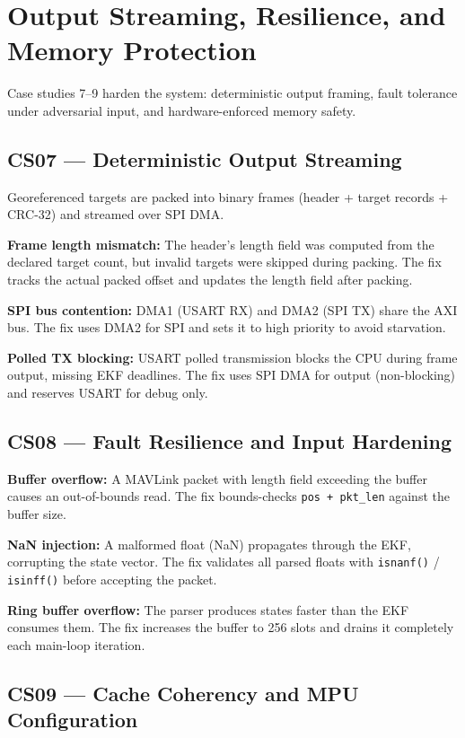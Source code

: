 \section{Output Streaming, Resilience, and Memory Protection}
\label{sec:cs07-09}

Case studies 7--9 harden the system: deterministic output framing, fault tolerance under adversarial input, and hardware-enforced memory safety.

\subsection{CS07 --- Deterministic Output Streaming}

Georeferenced targets are packed into binary frames (header + target records + CRC-32) and streamed over SPI DMA.

\textbf{Frame length mismatch:} The header's length field was computed from the declared target count, but invalid targets were skipped during packing. The fix tracks the actual packed offset and updates the length field after packing.

\textbf{SPI bus contention:} DMA1 (USART RX) and DMA2 (SPI TX) share the AXI bus. The fix uses DMA2 for SPI and sets it to high priority to avoid starvation.

\textbf{Polled TX blocking:} USART polled transmission blocks the CPU during frame output, missing EKF deadlines. The fix uses SPI DMA for output (non-blocking) and reserves USART for debug only.

\subsection{CS08 --- Fault Resilience and Input Hardening}

\textbf{Buffer overflow:} A MAVLink packet with length field exceeding the buffer causes an out-of-bounds read. The fix bounds-checks \texttt{pos + pkt\_len} against the buffer size.

\textbf{NaN injection:} A malformed float (NaN) propagates through the EKF, corrupting the state vector. The fix validates all parsed floats with \texttt{isnanf()} / \texttt{isinff()} before accepting the packet.

\textbf{Ring buffer overflow:} The parser produces states faster than the EKF consumes them. The fix increases the buffer to 256 slots and drains it completely each main-loop iteration.

\subsection{CS09 --- Cache Coherency and MPU Configuration}

